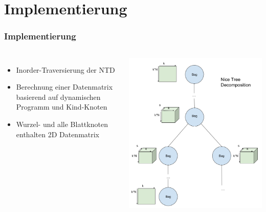 \documentclass{beamer}
\begin{document}
\section{Implementierung}
\begin{frame}
\frametitle{Implementierung}
\begin{columns}[c] %

\begin{itemize}
\item Inorder-Traversierung der NTD
\item Berechnung einer Datenmatrix basierend auf dynamischen Programm und Kind-Knoten
\item Wurzel- und alle Blattknoten enthalten 2D Datenmatrix
\end{itemize}

\includegraphics[scale=0.25]{./imgs/implementation.png}

\end{columns}
\end{frame}
\end{document}
